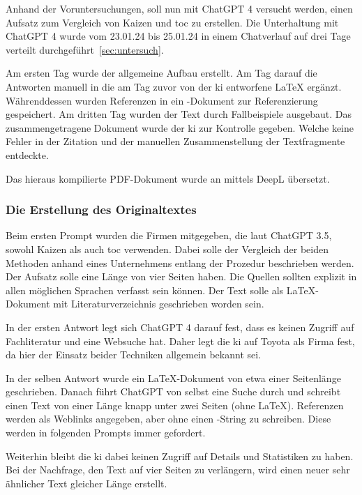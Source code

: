 Anhand der Voruntersuchungen, soll nun mit ChatGPT 4 versucht werden, einen Aufsatz zum Vergleich von Kaizen und \gls{toc} zu erstellen. Die Unterhaltung mit ChatGPT 4 wurde vom 23.01.24 bis 25.01.24 in einem Chatverlauf auf drei Tage verteilt durchgeführt~\ref{sec:untersuch}.

Am ersten Tag wurde der allgemeine Aufbau erstellt. Am Tag darauf die Antworten manuell in die am Tag zuvor von der \gls{ki} entworfene \LaTeX{} ergänzt. Währenddessen wurden Referenzen in ein \BibTeX{}-Dokument zur Referenzierung gespeichert. Am dritten Tag wurden der Text durch Fallbeispiele ausgebaut. Das zusammengetragene Dokument wurde der \gls{ki} zur Kontrolle gegeben. Welche keine Fehler in der Zitation und der manuellen Zusammenstellung der Textfragmente entdeckte. 

Das hieraus kompilierte PDF-Dokument wurde an mittels DeepL übersetzt. 


\subsubsection{Die Erstellung des Originaltextes}

Beim ersten Prompt wurden die Firmen mitgegeben, die laut ChatGPT 3.5, sowohl Kaizen als auch \gls{toc} verwenden. Dabei solle der Vergleich der beiden Methoden anhand eines Unternehmens entlang der Prozedur beschrieben werden. Der Aufsatz solle eine Länge von vier Seiten haben. Die Quellen sollten explizit in allen möglichen Sprachen verfasst sein können. Der Text solle als \LaTeX-Dokument mit Literaturverzeichnis geschrieben worden sein.

In der ersten Antwort legt sich ChatGPT 4 darauf fest, dass es keinen Zugriff auf Fachliteratur und eine Websuche hat. Daher legt die \gls{ki} auf Toyota als Firma fest, da hier der Einsatz beider Techniken allgemein bekannt sei.

In der selben Antwort wurde ein \LaTeX{}-Dokument von etwa einer Seitenlänge geschrieben.
Danach führt ChatGPT von selbst eine Suche durch und schreibt einen Text von einer Länge knapp unter zwei Seiten (ohne \LaTeX{}). Referenzen werden als Weblinks angegeben, aber ohne einen \BibTeX{}-String zu schreiben. Diese werden in folgenden Prompts immer gefordert.

Weiterhin bleibt die \gls{ki} dabei keinen Zugriff auf Details und Statistiken zu haben. Bei der Nachfrage, den Text auf vier Seiten zu verlängern, wird einen neuer sehr ähnlicher Text gleicher Länge erstellt.

